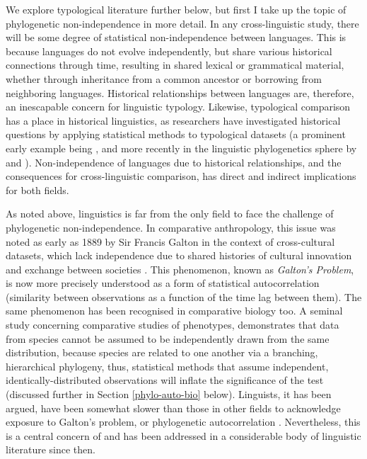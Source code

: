 We explore typological literature further below, but first I take up the topic of phylogenetic non-independence in more detail. In any cross-linguistic study, there will be some degree of statistical non-independence between languages. This is because languages do not evolve independently, but share various historical connections through time, resulting in shared lexical or grammatical material, whether through inheritance from a common ancestor or borrowing from neighboring languages. Historical relationships between languages are, therefore, an inescapable concern for linguistic typology. Likewise, typological comparison has a place in historical linguistics, as researchers have investigated historical questions by applying statistical methods to typological datasets (a prominent early example being \textcite{nichols_linguistic_1992}, and more recently in the linguistic phylogenetics sphere by \textcite{dunn_structural_2005} and \textcite{rexova_cladistic_2006}). Non-independence of languages due to historical relationships, and the consequences for cross-linguistic comparison, has direct and indirect implications for both fields.

As noted above, linguistics is far from the only field to face the challenge of phylogenetic non-independence. In comparative anthropology, this issue was noted as early as 1889 by Sir Francis Galton in the context of cross-cultural datasets, which lack independence due to shared histories of cultural innovation and exchange between societies \autocite[p.~15]{naroll_two_1961}. This phenomenon, known as \emph{Galton's Problem}, is now more precisely understood as a form of statistical autocorrelation (similarity between observations as a function of the time lag between them). The same phenomenon has been recognised in comparative biology too. A seminal study concerning comparative studies of phenotypes, \textcite{felsenstein_phylogenies_1985} demonstrates that data from species cannot be assumed to be independently drawn from the same distribution, because species are related to one another via a branching, hierarchical phylogeny, thus, statistical methods that assume independent, identically-distributed observations will inflate the significance of the test (discussed further in Section \ref{phylo-auto-bio} below). Linguists, it has been argued, have been somewhat slower than those in other fields to acknowledge exposure to Galton's problem, or phylogenetic autocorrelation \autocite[p.~293]{perkins_statistical_1989}. Nevertheless, this is a central concern of \textcite[p.~259]{dryer_large_1989} and has been addressed in a considerable body of linguistic literature since then.

